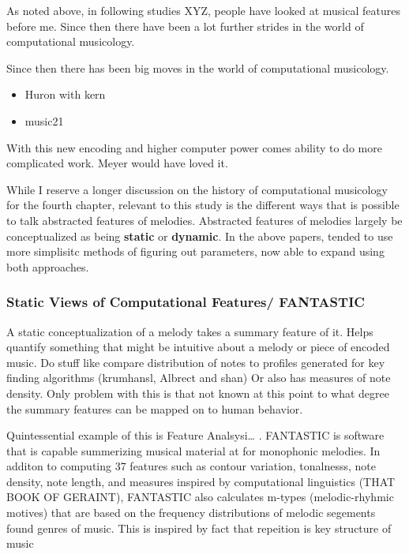 \documentclass[]{book}
\providecommand{\tightlist}{%
  \setlength{\itemsep}{0pt}\setlength{\parskip}{0pt}}
\theoremstyle{definition}
\theoremstyle{definition}
\theoremstyle{definition}
\theoremstyle{remark}
\begin{document}
As noted above, in following studies XYZ, people have looked at musical
features before me. Since then there have been a lot further strides in
the world of computational musicology.

Since then there has been big moves in the world of computational
musicology.

\begin{itemize}
\tightlist
\item
  Huron with kern \citep{huronHumdrumToolkitReference1994}
\item
  music21 \citep{cuthbertMusic21ToolkitComputerAided2010}
\end{itemize}

With this new encoding and higher computer power comes ability to do
more complicated work. Meyer would have loved it.

While I reserve a longer discussion on the history of computational
musicology for the fourth chapter, relevant to this study is the
different ways that is possible to talk abstracted features of melodies.
Abstracted features of melodies largely be conceptualized as being
\textbf{static} or \textbf{dynamic}. In the above papers, tended to use
more simplisitc methods of figuring out parameters, now able to expand
using both approaches.

\hypertarget{static-views-of-computational-features-fantastic}{%
\subsubsection{Static Views of Computational Features/
FANTASTIC}\label{static-views-of-computational-features-fantastic}}

A static conceptualization of a melody takes a summary feature of it.
Helps quantify something that might be intuitive about a melody or piece
of encoded music. Do stuff like compare distribution of notes to
profiles generated for key finding algorithms (krumhansl, Albrect and
shan) Or also has measures of note density. Only problem with this is
that not known at this point to what degree the summary features can be
mapped on to human behavior.

Quintessential example of this is Feature Analsysi\ldots{}
\citep{mullensiefenFantasticFeatureANalysis2009}. FANTASTIC is software
that is capable summerizing musical material at for monophonic melodies.
In additon to computing 37 features such as contour variation,
tonalnesss, note density, note length, and measures inspired by
computational linguistics (THAT BOOK OF GERAINT), FANTASTIC also
calculates m-types (melodic-rhyhmic motives) that are based on the
frequency distributions of melodic segements found genres of music. This
is inspired by fact that repeition is key structure of music
\citep{huronSweetAnticipation2006}
\end{document}
